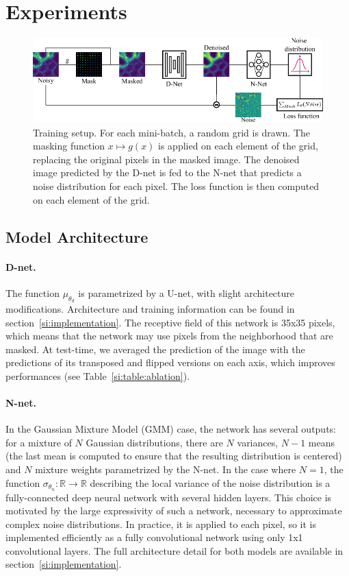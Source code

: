 \documentclass{article}
\begin{document}
\section{Experiments}
\begin{figure}[!htbp]
\vskip -0.1in
\begin{center}
\centerline{\includegraphics[width=\columnwidth]{fig_plomberie_1col.pdf}}
\caption{Training setup.
For each mini-batch, a random grid is drawn.
The masking function $x\mapsto g(x)$ is applied on each element of the grid, replacing the original pixels in the masked image.
The denoised image predicted by the D-net is fed to the N-net that predicts a noise distribution for each pixel.
The loss function is then computed on each element of the grid.
}
\label{fig:plumbing}
\end{center}
\end{figure}

\label{sec:experiments}
\subsection{Model Architecture}
\paragraph{D-net.}
The function $\mu_{\theta_d}$ is parametrized by a U-net, with slight architecture modifications.
Architecture and training information can be found in section~\ref{si:implementation}.
The receptive field of this network is 35x35 pixels, which means that the network may use pixels from the neighborhood that are masked.
At test-time, we averaged the prediction of the image with the predictions of its transposed and flipped versions on each axis, which improves performances (see Table~\ref{si:table:ablation}).

\paragraph{N-net.}
In the Gaussian Mixture Model (GMM) case, the network has several outputs: for a mixture of $N$ Gaussian distributions, there are $N$ variances, $N-1$ means (the last mean is computed to ensure that the resulting distribution is centered) and $N$ mixture weights parametrized by the N-net.
In the case where $N=1$, the function $\sigma_{\theta_n}: \mathbb{R} \to \mathbb{R}$ describing the local variance of the noise distribution is a fully-connected deep neural network with several hidden layers. This choice is motivated by the large expressivity of such a network, necessary to approximate complex noise distributions. In practice, it is applied to each pixel, so it is implemented efficiently as a fully convolutional network using only 1x1 convolutional layers. The full architecture detail for both models are available in section~\ref{si:implementation}.
\end{document}
